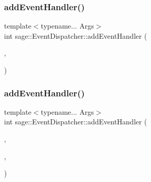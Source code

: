 \mbox{\label{classsage_1_1EventDispatcher_a871869f2a078e81c20a220a633d4e471}} 
\subsubsection{\texorpdfstring{addEventHandler()}{addEventHandler()}\hspace{0.1cm}{\footnotesize\ttfamily [2/3]}}
{\footnotesize\ttfamily template$<$typename... Args$>$ \\
int sage\+::\+Event\+Dispatcher\+::add\+Event\+Handler (\begin{DoxyParamCaption}\item[{\mbox{\hyperlink{namespacesage_afe706a25026cc74fe69b56d53a265d29}{Event}}}]{,  }\item[{std\+::function$<$ void(Args...)$>$ \&\&}]{ }\end{DoxyParamCaption})}

\mbox{\label{classsage_1_1EventDispatcher_a730d8eaf8806453d30dede2150b60071}} 
\subsubsection{\texorpdfstring{addEventHandler()}{addEventHandler()}\hspace{0.1cm}{\footnotesize\ttfamily [3/3]}}
{\footnotesize\ttfamily template$<$typename... Args$>$ \\
int sage\+::\+Event\+Dispatcher\+::add\+Event\+Handler (\begin{DoxyParamCaption}\item[{\mbox{\hyperlink{namespacesage_ad2c7b0e1ebf67f572d43620e6b07aa13}{Node\+Event}}}]{,  }\item[{\mbox{\hyperlink{classsage_1_1Node}{Node}} \&}]{,  }\item[{std\+::function$<$ void(Args...)$>$ \&\&}]{ }\end{DoxyParamCaption})}

\mbox{\label{classsage_1_1EventDispatcher_a096c6d68c684bb49ec1f8055c0e2a2d9}} 
